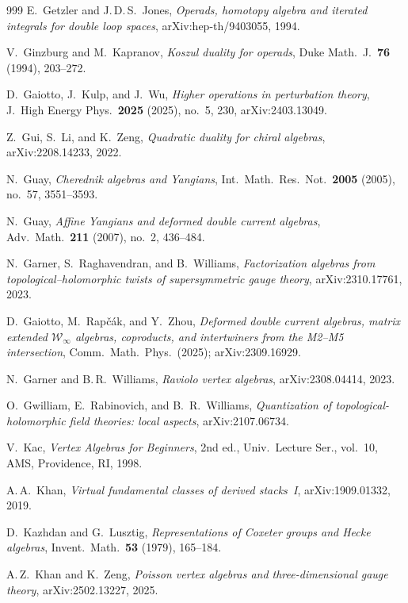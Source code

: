 \documentclass[11pt]{memoir}
\begin{document}
\begin{thebibliography}{999}
 E.~Getzler and J.\,D.\,S.~Jones, \emph{Operads, homotopy algebra and iterated integrals for double loop spaces}, arXiv:hep-th/9403055, 1994.

 V.~Ginzburg and M.~Kapranov, \emph{Koszul duality for operads}, Duke Math.\ J.\ \textbf{76} (1994), 203--272.

 D.~Gaiotto, J.~Kulp, and J.~Wu, \emph{Higher operations in perturbation theory}, J.\ High Energy Phys.\ \textbf{2025} (2025), no.~5, 230, arXiv:2403.13049.

 Z.~Gui, S.~Li, and K.~Zeng, \emph{Quadratic duality for chiral algebras}, arXiv:2208.14233, 2022.

 N.~Guay, \emph{Cherednik algebras and Yangians}, Int.\ Math.\ Res.\ Not.\ \textbf{2005} (2005), no.~57, 3551--3593.

 N.~Guay, \emph{Affine Yangians and deformed double current algebras}, Adv.\ Math.\ \textbf{211} (2007), no.~2, 436--484.

 N.~Garner, S.~Raghavendran, and B.~Williams, \emph{Factorization algebras from topological--holomorphic twists of supersymmetric gauge theory}, arXiv:2310.17761, 2023.

 D.~Gaiotto, M.~Rap\v{c}\'ak, and Y.~Zhou, \emph{Deformed double current algebras, matrix extended $\mathcal{W}_\infty$ algebras, coproducts, and intertwiners from the M2--M5 intersection}, Comm.~Math.~Phys.\ (2025); arXiv:2309.16929.


 N.~Garner and B.\,R.~Williams, \emph{Raviolo vertex algebras}, arXiv:2308.04414, 2023.

 O.~Gwilliam, E.~Rabinovich, and B.~R.~Williams, \emph{Quantization of topological-holomorphic field theories: local aspects}, arXiv:2107.06734.

 V.~Kac, \emph{Vertex Algebras for Beginners}, 2nd ed., Univ.\ Lecture Ser., vol.~10, AMS, Providence, RI, 1998.

 A.\,A.~Khan, \emph{Virtual fundamental classes of derived stacks~I}, arXiv:1909.01332, 2019.

 D.~Kazhdan and G.~Lusztig, \emph{Representations of Coxeter groups and Hecke algebras}, Invent.\ Math.\ \textbf{53} (1979), 165--184.

 A.\,Z.~Khan and K.~Zeng, \emph{Poisson vertex algebras and three-dimensional gauge theory}, arXiv:2502.13227, 2025.


\end{thebibliography}
\end{document}
